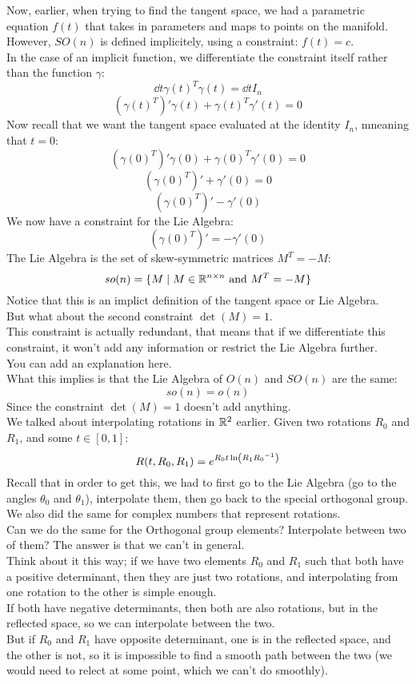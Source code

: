 \documentclass[12pt]{article}
\begin{document}
Now, earlier, when trying to find the
tangent space, we had a parametric
equation $f(t)$ that takes in parameters
and maps to points on the manifold. \\
However, $SO(n)$ is defined implicitely,
using a constraint: $f(t) = c$. \\
In the case of an implicit function,
we differentiate the constraint itself
rather than the function $\gamma$:
\[ \dd{}{t}\gamma(t)^T\gamma(t) = \dd{}{t}I_n \]
\[ (\gamma(t)^T)'\gamma(t)
+ \gamma(t)^T\gamma'(t) = 0 \]
Now recall that we want the tangent space
evaluated at the identity $I_n$,
mneaning that $t = 0$:
\[ (\gamma(0)^T)'\gamma(0)
+ \gamma(0)^T\gamma'(0) = 0  \]
\[ (\gamma(0)^T)' + \gamma'(0) = 0  \]
\[ (\gamma(0)^T)' - \gamma'(0)  \]
We now have a constraint for the Lie Algebra:
\[ (\gamma(0)^T)' = -\gamma'(0)  \]
The Lie Algebra is the set of skew-symmetric
matrices $M^T = -M$:
\[ so(n) = \{M \mid M \in \mathbb{R}^{n \times n}
\text{ and } M^T = -M \} \]
Notice that this is an implict definition
of the tangent space or Lie Algebra. \\

But what about the second constraint $\det(M) = 1$. \\
This constraint is actually redundant,
that means that if we differentiate this constraint,
it won't add any information or restrict the Lie
Algebra further. \\

You can add an explanation here. \\

What this implies is that the Lie Algebra
of $O(n)$ and $SO(n)$ are the same:
\[ so(n) = o(n) \]
Since the constraint $\det(M) = 1$
doesn't add anything. \\

We talked about interpolating
rotations in $\mathbb{R}^2$ earlier.
Given two rotations $R_0$ and $R_1$,
and some $t \in [0, 1]$:
\[ R(t,R_0,R_1) = 
e^{{R_0t\ln\left( {R_1}{R_0}^{-1} \right)}} \]
Recall that in order to get this,
we had to first go to the Lie Algebra
(go to the angles $\theta_0$ and $\theta_1$),
interpolate them,
then go back to the special orthogonal group. \\
We also did the same for complex numbers
that represent rotations. \\

Can we do the same for the Orthogonal
group elements? Interpolate between two of them?
The answer is that we can't in general. \\

Think about it this way;
if we have two elements $R_0$ and $R_1$
such that both have a positive determinant,
then they are just two rotations,
and interpolating from one rotation to the other
is simple enough. \\
If both have negative determinants,
then both are also rotations,
but in the reflected space,
so we can interpolate between the two. \\
But if $R_0$ and $R_1$ have opposite determinant,
one is in the reflected space,
and the other is not, so it is impossible
to find a smooth path between the two
(we would need to relect at some point,
which we can't do smoothly). \\
\end{document}
